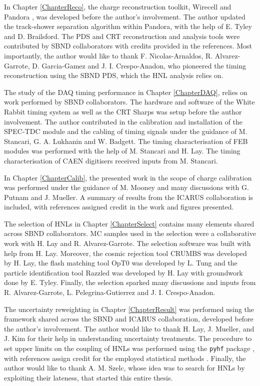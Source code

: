 \begin{declaration}
In Chapter \ref{ChapterReco}, the charge reconstruction toolkit, Wirecell \cite{wirecell} and Pandora \cite{pandora}, was developed before the author's involvement.
The author updated the track-shower separation algorithm within Pandora, with the help of E. Tyley and D. Brailsford.
The PDS and CRT reconstruction and analysis tools were contributed by SBND collaborators with credits provided in the references.
Most importantly, the author would like to thank F. Nicolas-Arnaldos, R. Alvarez-Garrote, D. Garcia-Gamez and J. I. Crespo-Anadon, who pioneered the timing reconstruction using the SBND PDS, which the HNL analysis relies on.

The study of the DAQ timing performance in Chapter \ref{ChapterDAQ}, relies on work performed by SBND collaborators.
The hardware and software of the White Rabbit timing system as well as the CRT Sharps was setup before the author involvement.
The author contributed in the calibration and installation of the SPEC-TDC module and the cabling of timing signals under the guidance of M. Stancari, G. A. Lukhanin and W. Badgett.
The timing characterisation of FEB modules was performed with the help of M. Stancari and H. Lay.
The timing characterisation of CAEN digitisers received inputs from M. Stancari.  

In Chapter \ref{ChapterCalib}, the presented work in the scope of charge calibration was performed under the guidance of M. Mooney and many discussions with G. Putnam and J. Mueller.
A summary of results from the ICARUS collaboration is included, with references assigned credit in the work and figures presented.

The selection of HNLs in Chapter \ref{ChapterSelect} contains many elements shared across SBND collaborators.
MC samples used in the selection were a collaborative work with H. Lay and R. Alvarez-Garrote.
The selection software was built with help from H. Lay. 
Moreover, the cosmic rejection tool CRUMBS was developed by H. Lay, the flash matching tool OpT0 was developed by L. Tung and the particle identification tool Razzled was developed by H. Lay with groundwork done by E. Tyley.
Finally, the selection sparked many discussions and inputs from R. Alvarez-Garrote, L. Pelegrina-Gutierrez and J. I. Crespo-Anadon.

The uncertainty reweighting in Chapter \ref{ChapterResult} was performed using the framework shared across the SBND and ICARUS collaboration, developed before the author's involvement.
The author would like to thank H. Lay, J. Mueller, and J. Kim for their help in understanding uncertainty treatments.
The procedure to set upper limits on the coupling of HNLs was performed using the \texttt{pyhf} package \cite{pyhf}, with references assign credit for the employed statistical methods \cite{asymptotic_test, CLs_Junk, CLs_Read}.
Finally, the author would like to thank A. M. Szelc, whose idea was to search for HNLs by exploiting their lateness, that started this entire thesis.  


\end{declaration}
